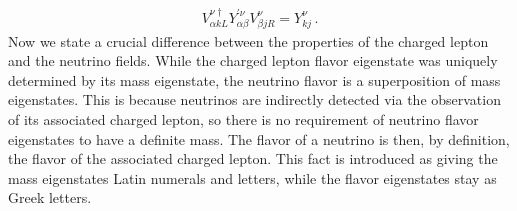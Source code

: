 \begin{align}
    V_{\alpha k L}^{\nu \dagger} Y^{\prime \nu}_{\alpha \beta} V_{\beta j R}^{\nu}=Y^{\nu}_{kj} \,.
\end{align}
Now we state a crucial difference between the properties of the charged lepton and the neutrino fields.
While the charged lepton flavor eigenstate was uniquely determined by its mass eigenstate, the neutrino flavor is a superposition of mass eigenstates. 
This is because neutrinos are indirectly detected via the observation of its associated charged lepton, so there is no requirement of neutrino flavor eigenstates to have a definite mass. 
The flavor of a neutrino is then, by definition, the flavor of the associated charged lepton. 
This fact is introduced as giving the mass eigenstates Latin numerals and letters, while the flavor eigenstates stay as Greek letters.

